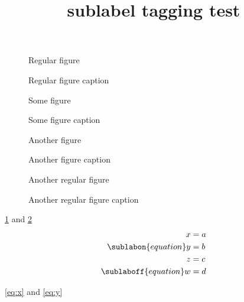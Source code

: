 \documentclass{article}
\title{sublabel tagging test}
\begin{document}
\begin{figure}
Regular figure
\caption{Regular figure caption}
\label{reg}
\end{figure}
\begin{figure}
Some figure
\caption{Some figure caption}
\label{nonreg}
\end{figure}
\begin{figure}
Another figure
\caption{Another figure caption}
\end{figure}
\begin{figure}
Another regular figure
\caption{Another regular figure caption}
\end{figure}
\ref{reg} and \ref{nonreg}
\begin{align}
x & = a \label{eq:x}\\%
\sublabon{equation}
y & = b \label{eq:y}\\%
z & = c \label{eq:z}\\%
\sublaboff{equation}
w & = d \label{eq:w} %
\end{align}

\eqref{eq:x} and \eqref{eq:y}
\end{document}
